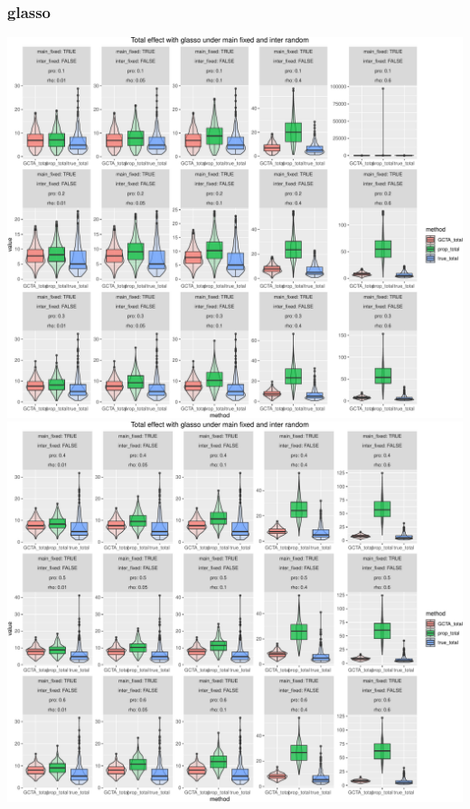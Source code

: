 \documentclass[]{article}
\begin{document}
\subsubsection{glasso}\label{glasso-1}

\includegraphics{Simulation_report_glasso_files/figure-latex/fixed random total glasso-1.pdf}
\includegraphics{Simulation_report_glasso_files/figure-latex/fixed random total glasso-2.pdf}
\end{document}
